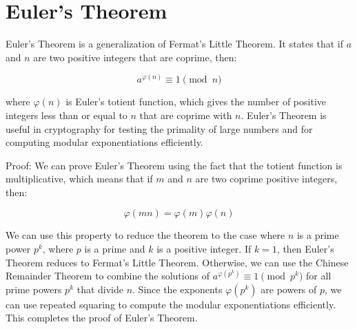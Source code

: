 \documentclass[12pt,openany]{book}
\begin{document}
	\newpage
	\section{Euler's Theorem}
	
	Euler's Theorem is a generalization of Fermat's Little Theorem. It states that if $a$ and $n$ are two positive integers that are coprime, then:
	
	$$a^{\varphi(n)} \equiv 1 \pmod{n}$$
	
	where $\varphi(n)$ is Euler's totient function, which gives the number of positive integers less than or equal to $n$ that are coprime with $n$. Euler's Theorem is useful in cryptography for testing the primality of large numbers and for computing modular exponentiations efficiently.
	
	Proof: We can prove Euler's Theorem using the fact that the totient function is multiplicative, which means that if $m$ and $n$ are two coprime positive integers, then:
	
	$$\varphi(mn) = \varphi(m) \varphi(n)$$
	
	We can use this property to reduce the theorem to the case where $n$ is a prime power $p^k$, where $p$ is a prime and $k$ is a positive integer. If $k=1$, then Euler's Theorem reduces to Fermat's Little Theorem. Otherwise, we can use the Chinese Remainder Theorem to combine the solutions of $a^{\varphi(p^k)} \equiv 1 \pmod{p^k}$ for all prime powers $p^k$ that divide $n$. Since the exponents $\varphi(p^k)$ are powers of $p$, we can use repeated squaring to compute the modular exponentiations efficiently. This completes the proof of Euler's Theorem.
	
\end{document}
